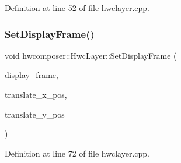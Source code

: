Definition at line 52 of file hwclayer.\+cpp.


\begin{DoxyCode}{0}
\end{DoxyCode}
\mbox{\label{structhwcomposer_1_1HwcLayer_a0bf1d6ab9b9d45a7e118567b493dd346}} 
\subsubsection{\texorpdfstring{Set\+Display\+Frame()}{SetDisplayFrame()}}
{\footnotesize\ttfamily void hwcomposer\+::\+Hwc\+Layer\+::\+Set\+Display\+Frame (\begin{DoxyParamCaption}\item[{const Hwc\+Rect$<$ int $>$ \&}]{display\+\_\+frame,  }\item[{int}]{translate\+\_\+x\+\_\+pos,  }\item[{int}]{translate\+\_\+y\+\_\+pos }\end{DoxyParamCaption})}



Definition at line 72 of file hwclayer.\+cpp.


